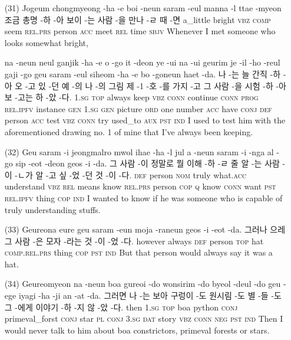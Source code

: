\begin{itemize}
\item [(31)]
\tgl
		{Jogeum chongmyeong -ha -e boi -neun saram -eul manna -l ttae -myeon}
		{조금 총명 -하 -아 보이 -는 사람 -을 만나 -ㄹ 때 -면}
		{a\_little	bright	\textsc{vbz}	\textsc{comp}	seem	\textsc{rel.prs}	person	\textsc{acc}	meet	\textsc{rel}	time	\textsc{sbjv}}
		{Whenever I met someone who looks somewhat bright,}
		
\tgl
		{na -neun neul ganjik -ha -e o -go it -deon ye -ui na -ui geurim je -il -ho -reul gaji -go geu saram -eul siheom -ha -e bo -goneun haet -da.}
		{나 -는 늘 간직 -하 -아 오 -고 있 -던 예 -의 나 -의 그림 제 -1 -호 -를 가지 -고 그 사람 -을 시험 -하 -아 보 -고는 하 -았 -다.}
		{\textsc{1.sg}	\textsc{top}	always	keep	\textsc{vbz}	\textsc{conn}	continue	\textsc{conn}	\textsc{prog}	\textsc{rel.ipfv}	instance	\textsc{gen}	\textsc{1.sg}	\textsc{gen}	picture	\textsc{ord}	one	number	\textsc{acc}	have	\textsc{conj}	\textsc{def}	person	\textsc{acc}	test	\textsc{vbz}	\textsc{conn}	try	used\_to	\textsc{aux}	\textsc{pst}	\textsc{ind}}
		{I used to test him with the aforementioned drawing no. 1 of mine that I've always been keeping.}

\item [(32)]
\tgl
		{Geu saram -i jeongmalro mwol ihae -ha -l jul a -neun saram -i -nga al -go sip -eot -deon geos -i -da.}
		{그 사람 -이 정말로 뭘 이해 -하 -ㄹ 줄 알 -는 사람 -이 -ㄴ가 알 -고 싶 -었 -던 것 -이 -다.}
		{\textsc{def}	person	\textsc{nom}	truly	what.\textsc{acc}	understand	\textsc{vbz}	\textsc{rel}	means	know	\textsc{rel.prs}	person	\textsc{cop}	\textsc{q}	know	\textsc{conn}	want	\textsc{pst}	\textsc{rel.ipfv}	thing	\textsc{cop}	\textsc{ind}}
		{I wanted to know if he was someone who is capable of truly understanding stuffs.}

\item [(33)]
\tgl
		{Geureona eure geu saram -eun moja -raneun geos -i -eot -da.}
		{그러나 으레 그 사람 -은 모자 -라는 것 -이 -었 -다.}
		{however	always	\textsc{def}	person	\textsc{top}	hat	\textsc{comp.rel.prs}	thing	\textsc{cop}	\textsc{pst}	\textsc{ind}}
		{But that person would always say it was a hat.}

\item [(34)]
\tgl
		{Geureomyeon na -neun boa gureoi -do wonsirim -do byeol -deul -do geu -ege iyagi -ha -ji an -at -da.}
		{그러면 나 -는 보아 구렁이 -도 원시림 -도 별 -들 -도 그 -에게 이야기 -하 -지 않 -았 -다.}
		{then	\textsc{1.sg}	\textsc{top}	boa	python	\textsc{conj}	primeval\_forst	\textsc{conj}	star	\textsc{pl}	\textsc{conj}	\textsc{3.sg}	\textsc{dat}	story	\textsc{vbz}	\textsc{conn}	\textsc{neg}	\textsc{pst}	\textsc{ind}}
		{Then I would never talk to him about boa constrictors, primeval forests or stars.}


\end{itemize}
